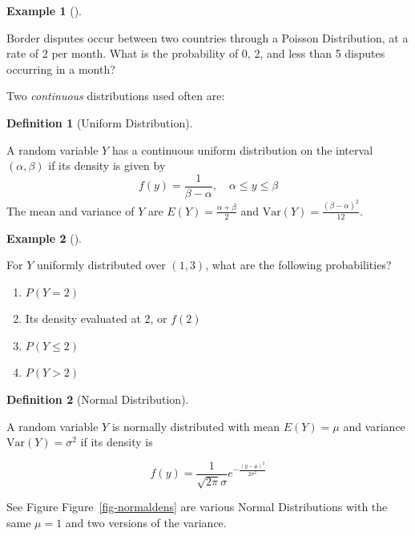 \documentclass[
  letterpaper,
]{book}
\providecommand{\tightlist}{%
  \setlength{\itemsep}{0pt}\setlength{\parskip}{0pt}}\usepackage{longtable,booktabs,array}
\theoremstyle{definition}
\newtheorem{definition}{Definition}[chapter]
\theoremstyle{definition}
\newtheorem{example}{Example}[chapter]
\theoremstyle{plain}
\theoremstyle{definition}
\theoremstyle{plain}
\theoremstyle{plain}
\theoremstyle{remark}
\begin{document}
\leavevmode{}%
\begin{example}[]\label{exm-}

Border disputes occur between two countries through a Poisson
Distribution, at a rate of 2 per month. What is the probability of 0, 2,
and less than 5 disputes occurring in a month?

\end{example}

Two \emph{continuous} distributions used often are:

\leavevmode{}%
\begin{definition}[Uniform Distribution]\label{def-}

A random variable \(Y\) has a continuous uniform distribution on the
interval \((\alpha,\beta)\) if its density is given by
\[f(y)=\frac{1}{\beta-\alpha}, \quad \alpha\le y\le \beta\] The mean and
variance of \(Y\) are \(E(Y)=\frac{\alpha+\beta}{2}\) and
\(\text{Var}(Y)=\frac{(\beta-\alpha)^2}{12}\).

\end{definition}

\leavevmode{}%
\begin{example}[]\label{exm-}

For \(Y\) uniformly distributed over \((1,3)\), what are the following
probabilities?

\begin{enumerate}
\def\labelenumi{\arabic{enumi}.}
\tightlist
\item
  \(P(Y=2)\)
\item
  Its density evaluated at 2, or \(f(2)\)
\item
  \(P(Y \le 2)\)
\item
  \(P(Y > 2)\)
\end{enumerate}

\end{example}

\leavevmode{}%
\begin{definition}[Normal Distribution]\label{def-}

A random variable \(Y\) is normally distributed with mean \(E(Y)=\mu\)
and variance \(\text{Var}(Y)=\sigma^2\) if its density is

\[f(y)=\frac{1}{\sqrt{2\pi}\sigma}e^{-\frac{(y-\mu)^2}{2\sigma^2}}\]

\end{definition}

See Figure Figure~\ref{fig-normaldens} are various Normal Distributions
with the same \(\mu = 1\) and two versions of the variance.
\end{document}
